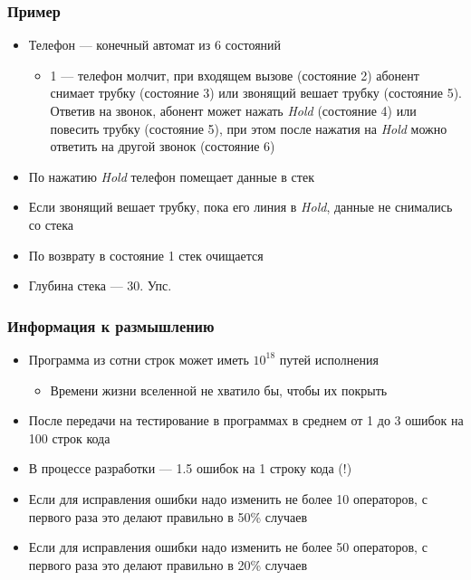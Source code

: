 \documentclass[xetex,mathserif,serif]{beamer}
\begin{document}
	\begin{frame}
		\frametitle{Пример}
		\begin{itemize}
			\item Телефон --- конечный автомат из 6 состояний
			\begin{itemize}
				\item 1 --- телефон молчит, при входящем вызове (состояние 2) абонент снимает трубку (состояние 3) или
					звонящий вешает трубку (состояние 5). Ответив на звонок, абонент может нажать \textit{Hold} (состояние 4)
					или повесить трубку (состояние 5), при этом после нажатия на \textit{Hold} можно ответить на другой звонок
					(состояние 6)
			\end{itemize}
			\item По нажатию \textit{Hold} телефон помещает данные в стек
			\item Если звонящий вешает трубку, пока его линия в \textit{Hold}, данные не снимались со стека
			\item По возврату в состояние 1 стек очищается
			\item Глубина стека --- 30. Упс.
		\end{itemize}
	\end{frame}

	\begin{frame}
		\frametitle{Информация к размышлению}
		\begin{itemize}
			\item Программа из сотни строк может иметь $10^{18}$ путей исполнения
			\begin{itemize}
				\item Времени жизни вселенной не хватило бы, чтобы их покрыть
			\end{itemize}
			\item После передачи на тестирование в программах в среднем от 1 до 3 ошибок на 100 строк кода
			\item В процессе разработки --- 1.5 ошибок на 1 строку кода (!)
			\item Если для исправления ошибки надо изменить не более 10 операторов, с первого раза это делают правильно в 50\% случаев
			\item Если для исправления ошибки надо изменить не более 50 операторов, с первого раза это делают правильно в 20\% случаев
		\end{itemize}
	\end{frame}
\end{document}
